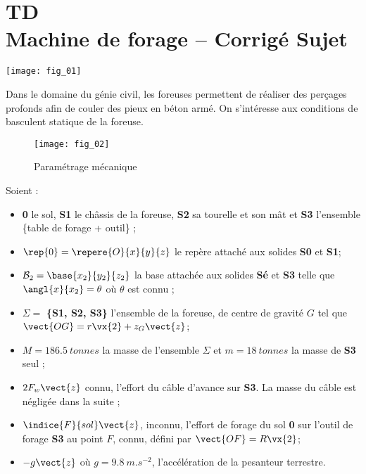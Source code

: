\chapter*{TD  \\ 
Machine de forage -- \ifprof Corrigé \else Sujet \fi}

\iflivret {} \else
\ifprof  {} \else \fi
\fi

\setcounter{question}{0}

\begin{marginfigure}
\texttt{[image: fig\_01]}
\end{marginfigure}


Dans le domaine du génie civil, les foreuses permettent de réaliser des perçages profonds afin de couler des pieux en béton armé. On s'intéresse aux conditions de basculent statique de la foreuse. 


\begin{figure}[!h]
\centering
\texttt{[image: fig\_02]}
\caption{Paramétrage mécanique}
\end{figure}

Soient : 
\begin{itemize}
\item \textbf{0} le sol, \textbf{S1} le châssis de la foreuse, \textbf{S2} sa tourelle et son mât et \textbf{S3} l’ensemble \{table de forage + outil\} ; 
\item $\rep{0} = \repere{O}{x}{y}{z}$ le repère attaché aux solides \textbf{S0} et \textbf{S1}; 
\item $\mathcal{B}_2=\base{x_2}{y_2}{z_2}$ la base attachée aux solides \textbf{Sé} et \textbf{S3} telle que $\angl{x}{x_2}=\theta$ où $\theta$ est connu ;
\item $\Sigma = $ \textbf{\{S1, S2, S3\}} l’ensemble de la foreuse, de centre de gravité $G$ tel que $\vect{OG} = r \vx{2} +  z_G \vect{z}$;
\item $M = \SI{186,5}{tonnes}$ la masse de l’ensemble $\Sigma$ et $m =\SI{18}{tonnes}$ la masse de \textbf{S3} seul ; 
\item $2F_w \vect{z}$ connu, l’effort du câble d’avance sur \textbf{S3}. La masse du câble est négligée dans la suite ; 
\item $\indice{F}{sol}\vect{z}$, inconnu, l’effort de forage du sol \textbf{0} sur l’outil de forage \textbf{S3} au point $F$, connu, défini par $\vect{OF}=R\vx{2}$;
\item $-g\vect{z}$  où $g = \SI{9,8}{m.s^{-2}}$, l’accélération de la pesanteur terrestre.
\end{itemize}

